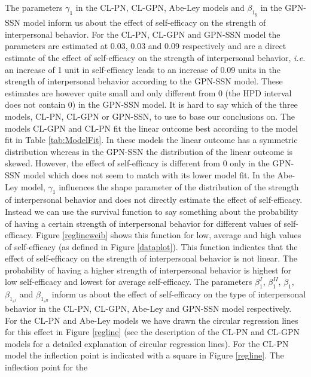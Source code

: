 \documentclass[man]{apa6}
\begin{document}
The parameters \(\gamma_1\) in the CL-PN, CL-GPN, Abe-Ley models and \(\beta_{1_y}\)
in the GPN-SSN model inform us about the effect of self-efficacy on the strength
of interpersonal behavior. For the CL-PN, CL-GPN and GPN-SSN model the
parameters are estimated at 0.03, 0.03 and 0.09 respectively and are a direct
estimate of the effect of self-efficacy on the strength of interpersonal
behavior, \emph{i.e.} an increase of 1 unit in self-efficacy leads to an
increase of 0.09 units in the strength of interpersonal behavior according to
the GPN-SSN model. These estimates are however quite small and only different
from 0 (the HPD interval does not contain 0) in the GPN-SSN model. It is hard to
say which of the three models, CL-PN, CL-GPN or GPN-SSN, to use to base our
conclusions on. The models CL-GPN and CL-PN fit the linear outcome best according
to the model fit in Table \ref{tab:ModelFit}. In these models the linear outcome has a
symmetric distribution whereas in the GPN-SSN the distribution of the linear
outcome is skewed. However, the effect of self-efficacy is different from 0 only
in the GPN-SSN model which does not seem to match with its lower model fit.\newline
\indent In the Abe-Ley model, \(\gamma_1\) influences the shape parameter of the distribution of
the strength of interpersonal behavior and does not directly estimate the effect
of self-efficacy. Instead we can use the survival function to say something
about the probability of having a certain strength of interpersonal behavior for
different values of self-efficacy. Figure \ref{reglineweib} shows this function
for low, average and high values of self-efficacy (as defined in Figure
\ref{dataplot}). This function indicates that the effect of self-efficacy on the
strength of interpersonal behavior is not linear. The probability of having a
higher strength of interpersonal behavior is highest for low self-efficacy and
lowest for average self-efficacy.\newline
\indent The parameters \(\beta_1^{I}\), \(\beta_1^{II}\), \(\beta_1\),
\(\beta_{1_{s^{I}}}\) and \(\beta_{1_{s^{II}}}\) inform us about the effect of
self-efficacy on the type of interpersonal behavior in the CL-PN, CL-GPN,
Abe-Ley and GPN-SSN model respectively. For the CL-PN and Abe-Ley models we have
drawn the circular regression lines for this effect in Figure \ref{regline} (see
the description of the CL-PN and CL-GPN models for a detailed explanation of
circular regression lines). For the CL-PN model the inflection point is
indicated with a square in Figure \ref{regline}. The inflection point for the
\end{document}
